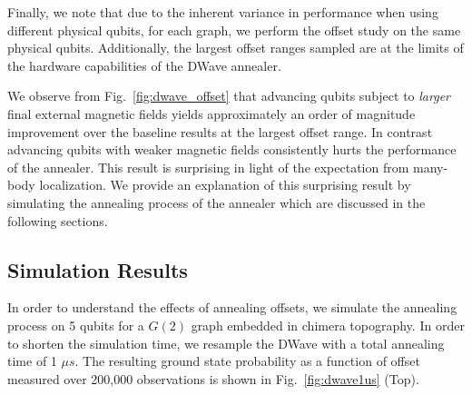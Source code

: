 \documentclass[prd,twocolumn,tightenlines,preprintnumbers,showpacs,superscriptaddress,notitlepage,nofootinbib,eqsecnum,floatfix,longbibliography]{revtex4}
\begin{document}
Finally, we note that due to the inherent variance in performance when using different physical qubits, for each graph, we perform the offset study on the same physical qubits. Additionally, the largest offset ranges sampled are at the limits of the hardware capabilities of the DWave annealer.

We observe from Fig.~\ref{fig:dwave_offset} that advancing qubits subject to \textit{larger} final external magnetic fields yields approximately an order of magnitude improvement over the baseline results at the largest offset range. In contrast advancing qubits with weaker magnetic fields consistently hurts the performance of the annealer. This result is surprising in light of the expectation from many-body localization. We provide an explanation of this surprising result by simulating the annealing process of the annealer which are discussed in the following sections.

\subsection{Simulation Results}

In order to understand the effects of annealing offsets, we simulate the annealing process on 5 qubits for a $G(2)$ graph embedded in chimera topography. In order to shorten the simulation time, we resample the DWave with a total annealing time of 1 $\mu s$. The resulting ground state probability as a function of offset measured over 200,000 observations is shown in Fig.~\ref{fig:dwave1us} (Top).
\end{document}
